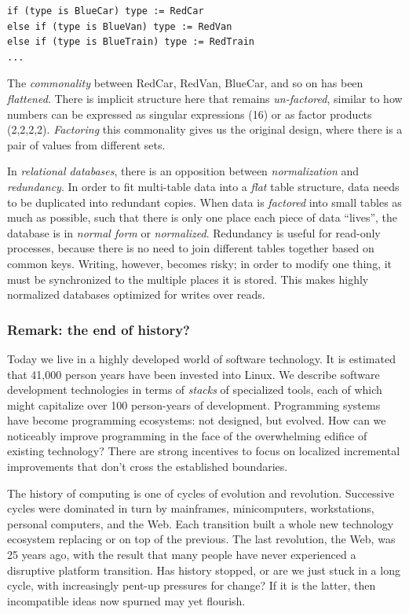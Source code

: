 \documentclass[english,submission]{programming}
\begin{document}
\begin{verbatim}
if (type is BlueCar) type := RedCar
else if (type is BlueVan) type := RedVan
else if (type is BlueTrain) type := RedTrain
...
\end{verbatim}

The \emph{commonality} between RedCar, RedVan, BlueCar, and so on has
been \emph{flattened}. There is implicit structure here that remains
\emph{un-factored}, similar to how numbers can be expressed as singular
expressions (16) or as factor products (2,2,2,2). \emph{Factoring} this
commonality gives us the original design, where there is a pair of
values from different sets.

In \emph{relational databases}, there is an opposition between
\emph{normalization} and \emph{redundancy}. In order to fit multi-table
data into a \emph{flat} table structure, data needs to be duplicated
into redundant copies. When data is \emph{factored} into small tables as
much as possible, such that there is only one place each piece of data
``lives'', the database is in \emph{normal form} or \emph{normalized}.
Redundancy is useful for read-only processes, because there is no need
to join different tables together based on common keys. Writing,
however, becomes risky; in order to modify one thing, it must be
synchronized to the multiple places it is stored. This makes highly
normalized databases optimized for writes over reads.

\hypertarget{remark-the-end-of-history}{%
\subsubsection{Remark: the end of
history?}\label{remark-the-end-of-history}}

Today we live in a highly developed world of software technology. It is
estimated that 41,000 person years have been invested into Linux. We
describe software development technologies in terms of \emph{stacks} of
specialized tools, each of which might capitalize over 100 person-years
of development. Programming systems have become programming ecosystems:
not designed, but evolved. How can we noticeably improve programming in
the face of the overwhelming edifice of existing technology? There are
strong incentives to focus on localized incremental improvements that
don't cross the established boundaries.

The history of computing is one of cycles of evolution and revolution.
Successive cycles were dominated in turn by mainframes, minicomputers,
workstations, personal computers, and the Web. Each transition built a
whole new technology ecosystem replacing or on top of the previous. The
last revolution, the Web, was 25 years ago, with the result that many
people have never experienced a disruptive platform transition. Has
history stopped, or are we just stuck in a long cycle, with increasingly
pent-up pressures for change? If it is the latter, then incompatible
ideas now spurned may yet flourish.
\end{document}
